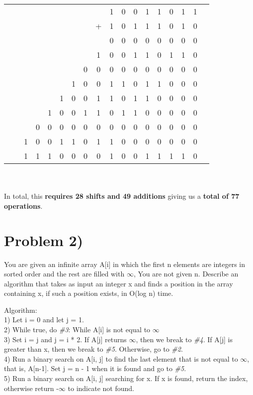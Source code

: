 \documentclass{article}
\begin{document}
\begin{tabular}{cccccccccccccccccc}
&&&&&&&&& 1 & 0 & 0 & 1 & 1& 0 &1 &1 \\    
&&&&&&&& + & 1 & 0 & 1 & 1 & 1 & 0 & 1 & 0 \\ \hline
&&&&&&&&& 0 & 0 & 0 & 0 & 0 & 0 & 0 & 0 \\
&&&&&&&& 1 & 0 & 0 & 1 & 1 & 0 & 1 & 1 & 0 \\ 
&&&&&&& 0 & 0 & 0 & 0 & 0 & 0 & 0 & 0 & 0 & 0 \\
&&&&&& 1 & 0 & 0 & 1 & 1 & 0 & 1 & 1 & 0 & 0 & 0\\ 
&&&&& 1 & 0 & 0 & 1 & 1 & 0 & 1 & 1 & 0 & 0 & 0 & 0 \\
&&&& 1 & 0 & 0 & 1 & 1 & 0 & 1 & 1 & 0 & 0 & 0 & 0 & 0 \\
&&& 0 & 0 & 0 & 0 & 0 & 0 & 0 & 0 & 0 & 0 & 0 & 0 & 0 & 0\\
&& 1 & 0 & 0 & 1 & 1 & 0 & 1 & 1 & 0 & 0 & 0 & 0 & 0 & 0 & 0\\ \hline
&& 1 & 1 & 1 & 0 & 0 & 0 & 0 & 1 & 0 & 0 & 1 & 1 & 1 & 1 & 0\\
\end{tabular} \\
\\
In total, this \textbf{requires 28 shifts and 49 additions} giving us a \textbf{total of 77 operations}.

\section*{Problem 2)} You are given an infinite array A[i] in which the first n elements are integers in sorted order and the
rest are filled with $\infty$, You are not given n. Describe an algorithm that takes as input an integer x and finds
a position in the array containing x, if such a position exists, in O(log n) time.

Algorithm:\\
1) Let i = 0 and let j = 1.  \\
2) While true, do \emph{\#3}: While A[i] is not equal to $\infty$  \\
3) Set i = j and j = i * 2. If A[j] returns $\infty$, then we break to \emph{\#4}. If A[j] is greater than x, then we break to \emph{\#5}. Otherwise, go to \emph{\#2}. \\
4) Run a binary search on A[i, j] to find the last element that is not equal to $\infty$, that is, A[n-1]. Set j = n - 1 when it is found and go to \emph{\#5}. \\
5) Run a binary search on A[i, j] searching for x. If x is found, return the index, otherwise return -$\infty$ to indicate not found.
\end{document}
